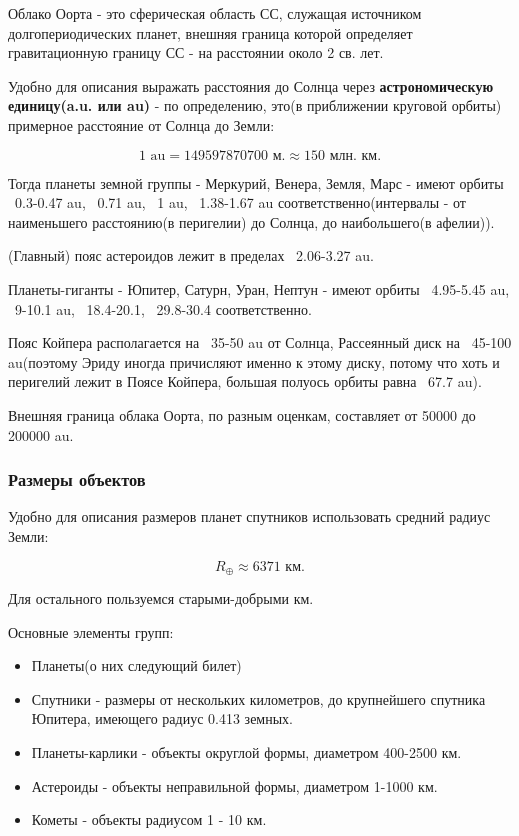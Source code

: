 Облако Оорта - это сферическая область СС, служащая источником долгопериодических планет, внешняя граница которой определяет гравитационную границу СС - на расстоянии около 2 св. лет.

Удобно для описания выражать расстояния до Солнца через \textbf{астрономическую единицу(a.u. или au)} - по определению, это(в приближении круговой орбиты) примерное расстояние от Солнца до Земли:

\begin{equation}
1 \text{ au} = 149 597 870 700 \text{ м.} \approx 150 \text{ млн. км.}
\label{eq:3_au}
\end{equation}

Тогда планеты земной группы - Меркурий, Венера, Земля, Марс - имеют орбиты ~0.3-0.47 au, ~0.71 au, ~1 au, ~1.38-1.67 au соответственно(интервалы - от наименьшего расстоянию(в перигелии) до Солнца, до наибольшего(в афелии)).

(Главный) пояс астероидов лежит в пределах ~2.06-3.27 au.

Планеты-гиганты - Юпитер, Сатурн, Уран, Нептун - имеют орбиты ~4.95-5.45 au, ~9-10.1 au, ~18.4-20.1, ~29.8-30.4 соответственно.

Пояс Койпера располагается на ~35-50 au от Солнца, Рассеянный диск на ~45-100 au(поэтому Эриду иногда причисляют именно к этому диску, потому что хоть и перигелий лежит в Поясе Койпера, большая полуось орбиты равна ~67.7 au).

Внешняя граница облака Оорта, по разным оценкам, составляет от 50000 до 200000 au.

\subsubsection{Размеры объектов}

Удобно для описания размеров планет спутников использовать средний радиус Земли:

\begin{equation}
R_{\oplus} \approx 6371 \text{ км.}
\label{eq:3_r_earth}
\end{equation}

Для остального пользуемся старыми-добрыми км.

Основные элементы групп:

\begin{itemize}
	\item Планеты(о них следующий билет)
	\item Спутники - размеры от нескольких километров, до крупнейшего спутника Юпитера, имеющего радиус 0.413 земных.
	\item Планеты-карлики - объекты округлой формы, диаметром 400-2500 км.
	\item Астероиды - объекты неправильной формы, диаметром 1-1000 км.
	\item Кометы - объекты радиусом 1 - 10 км.
\end{itemize}

